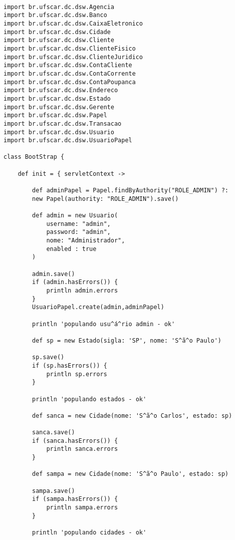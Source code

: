 \begin{lstlisting}[caption={\bf BootStrap.groovy (1)}, frame = trBL, float=htbp,
    label=codBootStrap21]

import br.ufscar.dc.dsw.Agencia
import br.ufscar.dc.dsw.Banco
import br.ufscar.dc.dsw.CaixaEletronico
import br.ufscar.dc.dsw.Cidade
import br.ufscar.dc.dsw.Cliente
import br.ufscar.dc.dsw.ClienteFisico
import br.ufscar.dc.dsw.ClienteJuridico
import br.ufscar.dc.dsw.ContaCliente
import br.ufscar.dc.dsw.ContaCorrente
import br.ufscar.dc.dsw.ContaPoupanca
import br.ufscar.dc.dsw.Endereco
import br.ufscar.dc.dsw.Estado
import br.ufscar.dc.dsw.Gerente
import br.ufscar.dc.dsw.Papel
import br.ufscar.dc.dsw.Transacao
import br.ufscar.dc.dsw.Usuario
import br.ufscar.dc.dsw.UsuarioPapel

class BootStrap {

    def init = { servletContext ->
       
        def adminPapel = Papel.findByAuthority("ROLE_ADMIN") ?:
        new Papel(authority: "ROLE_ADMIN").save()
                
        def admin = new Usuario(
            username: "admin",
            password: "admin",
            nome: "Administrador",
            enabled : true
        )
        
        admin.save()
        if (admin.hasErrors()) {
            println admin.errors
        }
        UsuarioPapel.create(admin,adminPapel)
       
        println 'populando usu^á^rio admin - ok'
        
        def sp = new Estado(sigla: 'SP', nome: 'S^ã^o Paulo')
        
        sp.save()
        if (sp.hasErrors()) {
            println sp.errors
        }
        
        println 'populando estados - ok'
        
        def sanca = new Cidade(nome: 'S^ã^o Carlos', estado: sp)
        
        sanca.save()
        if (sanca.hasErrors()) {
            println sanca.errors
        }
        
        def sampa = new Cidade(nome: 'S^ã^o Paulo', estado: sp)
        
        sampa.save()
        if (sampa.hasErrors()) {
            println sampa.errors
        }
        
        println 'populando cidades - ok'
\end{lstlisting}

